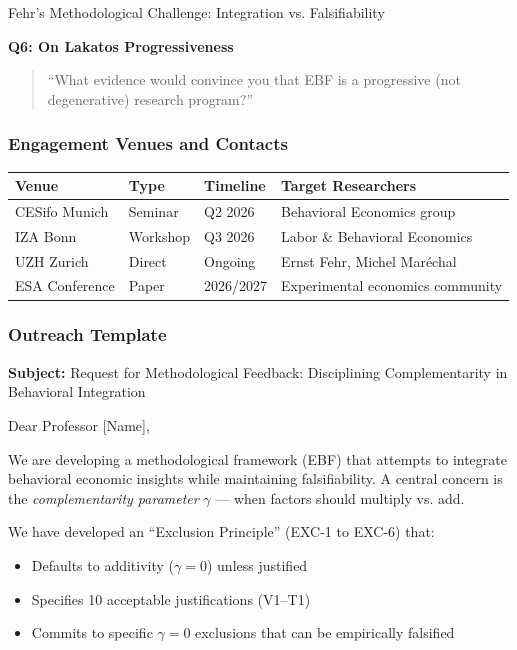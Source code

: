 \begin{chapter}{Fehr's Methodological Challenge: Integration vs. Falsifiability}
\begin{tcolorbox}[colback=orange!5!white,colframe=orange!75!black,title=\textbf{Structured Interview Protocol}]
\textbf{Q6: On Lakatos Progressiveness}
\begin{quote}
``What evidence would convince you that EBF is a progressive (not degenerative) research program?''
\end{quote}
\end{tcolorbox}

\subsubsection{Engagement Venues and Contacts}

\begin{tabular}{|l|l|l|p{5cm}|}
\hline
\textbf{Venue} & \textbf{Type} & \textbf{Timeline} & \textbf{Target Researchers} \\
\hline
CESifo Munich & Seminar & Q2 2026 & Behavioral Economics group \\
\hline
IZA Bonn & Workshop & Q3 2026 & Labor \& Behavioral Economics \\
\hline
UZH Zurich & Direct & Ongoing & Ernst Fehr, Michel Maréchal \\
\hline
ESA Conference & Paper & 2026/2027 & Experimental economics community \\
\hline
\end{tabular}

\subsubsection{Outreach Template}

\begin{tcolorbox}[colback=gray!5!white,colframe=gray!75!black,title=\textbf{Email Draft for Fehr-Tradition Researchers}]
\textbf{Subject:} Request for Methodological Feedback: Disciplining Complementarity in Behavioral Integration

Dear Professor [Name],

We are developing a methodological framework (EBF) that attempts to integrate behavioral economic insights while maintaining falsifiability. A central concern is the \textit{complementarity parameter} $\gamma$ --- when factors should multiply vs. add.

We have developed an ``Exclusion Principle'' (EXC-1 to EXC-6) that:
\begin{itemize}[noitemsep]
    \item Defaults to additivity ($\gamma = 0$) unless justified
    \item Specifies 10 acceptable justifications (V1--T1)
    \item Commits to specific $\gamma = 0$ exclusions that can be empirically falsified
\end{itemize}


\end{tcolorbox}
\end{chapter}
